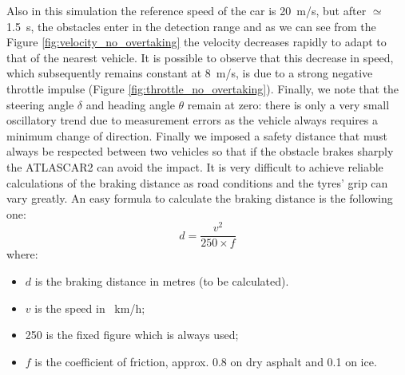 Also in this simulation the reference speed of the car is \SI{20}{m/s}, but after $\simeq$\SI{1,5}{s}, the obstacles enter in the detection range and as we can see from the Figure \ref{fig:velocity_no_overtaking} the velocity decreases rapidly to adapt to that of the nearest vehicle. It is possible to observe that this decrease in speed, which subsequently remains constant at \SI{8}{m/s}, is due to a strong negative throttle impulse (Figure \ref{fig:throttle_no_overtaking}). Finally, we note that the steering angle $\delta$ and heading angle $\theta$ remain at zero: there is only a very small oscillatory trend due to measurement errors as the vehicle always requires a minimum change of direction.
Finally we imposed a safety distance that must always be respected between two vehicles so that if the obstacle brakes sharply the ATLASCAR2 can avoid the impact.
It is very difficult to achieve reliable calculations of the braking distance as road conditions and the tyres' grip can vary greatly. An easy formula to calculate the braking distance is the following one:
\begin{equation}
	d = \frac{v^2}{250\times f}
\end{equation}
where:
\begin{itemize}
	\item $d$ is the braking distance in metres (to be calculated).
	\item $v$ is the speed in \SI{}{km/h};
	\item 250 is the fixed figure which is always used;
	\item $f$ is the coefficient of friction, approx. 0.8 on dry asphalt and 0.1 on ice.
\end{itemize}

